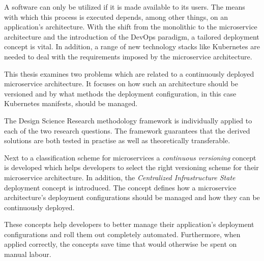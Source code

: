 
A software can only be utilized if it is made available to its users. The means
with which this process is executed depends, among other things, on an
application's architecture. With the shift from the monolithic to the
microservice architecture and the introduction of the DevOps paradigm, a
tailored deployment concept is vital. In addition, a range of new technology
stacks like Kubernetes are needed to deal with the requirements imposed by the
microservice architecture.

This thesis examines two problems which are related to a continuously deployed
microservice architecture. It focuses on how such an architecture should be
versioned and by what methods the deployment configuration, in this case
Kubernetes manifests, should be managed.

The Design Science Research methodology framework is individually applied to
each of the two research questions. The framework guarantees that the derived
solutions are both tested in practise as well as theoretically transferable.

Next to a classification scheme for microservices a \textit{continuous
versioning} concept is developed which helps developers to select the right
versioning scheme for their microservice architecture. In addition, the
\textit{Centralized Infrastructure State} deployment concept is introduced.
The concept defines how a microservice architecture's deployment configurations
should be managed and how they can be continuously deployed.

These concepts help developers to better manage their application's deployment
configurations and roll them out completely automated. Furthermore, when
applied correctly, the concepts save time that would otherwise be spent on
manual labour.
